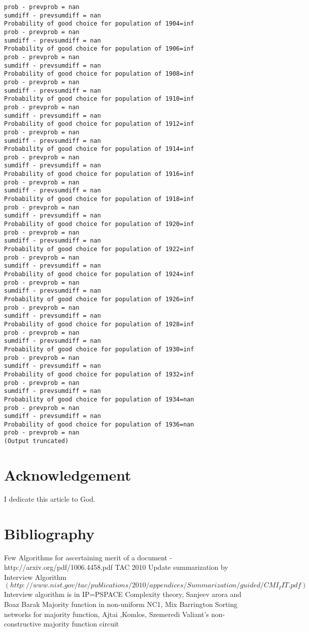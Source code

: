 \documentclass[11pt,onecolumn]{article}
\begin{document}
\begin{verbatim}
prob - prevprob = nan
sumdiff - prevsumdiff = nan
Probability of good choice for population of 1904=inf
prob - prevprob = nan
sumdiff - prevsumdiff = nan
Probability of good choice for population of 1906=inf
prob - prevprob = nan
sumdiff - prevsumdiff = nan
Probability of good choice for population of 1908=inf
prob - prevprob = nan
sumdiff - prevsumdiff = nan
Probability of good choice for population of 1910=inf
prob - prevprob = nan
sumdiff - prevsumdiff = nan
Probability of good choice for population of 1912=inf
prob - prevprob = nan
sumdiff - prevsumdiff = nan
Probability of good choice for population of 1914=inf
prob - prevprob = nan
sumdiff - prevsumdiff = nan
Probability of good choice for population of 1916=inf
prob - prevprob = nan
sumdiff - prevsumdiff = nan
Probability of good choice for population of 1918=inf
prob - prevprob = nan
sumdiff - prevsumdiff = nan
Probability of good choice for population of 1920=inf
prob - prevprob = nan
sumdiff - prevsumdiff = nan
Probability of good choice for population of 1922=inf
prob - prevprob = nan
sumdiff - prevsumdiff = nan
Probability of good choice for population of 1924=inf
prob - prevprob = nan
sumdiff - prevsumdiff = nan
Probability of good choice for population of 1926=inf
prob - prevprob = nan
sumdiff - prevsumdiff = nan
Probability of good choice for population of 1928=inf
prob - prevprob = nan
sumdiff - prevsumdiff = nan
Probability of good choice for population of 1930=inf
prob - prevprob = nan
sumdiff - prevsumdiff = nan
Probability of good choice for population of 1932=inf
prob - prevprob = nan
sumdiff - prevsumdiff = nan
Probability of good choice for population of 1934=nan
prob - prevprob = nan
sumdiff - prevsumdiff = nan
Probability of good choice for population of 1936=nan
prob - prevprob = nan
(Output truncated)
\end{verbatim}

\section{Acknowledgement}
I dedicate this article to God.

\section{Bibliography}
\begin{thebibliography}{99}
 Few Algorithms for ascertaining merit of a document - http://arxiv.org/pdf/1006.4458.pdf
 TAC 2010 Update summarization by Interview Algorithm $(http://www.nist.gov/tac/publications/2010/appendices/Summarization/guided/CMI_IIT.pdf)$
 Interview algorithm is in IP=PSPACE
 Complexity theory, Sanjeev arora and Boaz Barak
 Majority function in non-uniform NC1, Mix Barrington
 Sorting networks for majority function, Ajtai ,Komlos, Szemeredi
 Valiant's non-constructive majority function circuit

\end{thebibliography}
\end{document}
